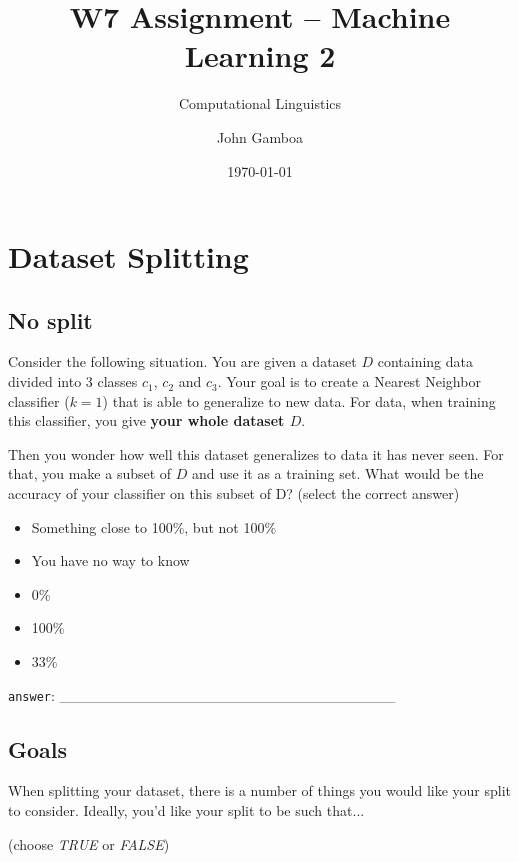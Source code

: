 \documentclass[a4paper,11pt]{scrartcl}
\title{W7 Assignment -- Machine Learning 2}
\subtitle{Computational Linguistics}
\author{John Gamboa}
\date{\today}
\begin{document}
\maketitle

\section{Dataset Splitting}

\subsection{No split}

Consider the following situation. You are given a dataset $D$ containing data
divided into 3 classes $c_1$, $c_2$ and $c_3$.
Your goal is to create a Nearest Neighbor classifier ($k=1$) that is able to
generalize to new data. For data, when training this classifier, you give
\textbf{your whole dataset $D$}.

Then you wonder how well this dataset generalizes to data it has never seen.
For that, you make a subset of $D$ and use it as a training set.
What would be the accuracy of your classifier on this subset of D?
(select the correct answer)

\begin{itemize}
\singlespacing
\item Something close to 100\%, but not 100\%
\item You have no way to know
\item 0\%
\item 100\%
\item 33\%
\end{itemize}

\verb|answer|: \_\_\_\_\_\_\_\_\_\_\_\_\_\_\_\_\_\_\_\_\_\_\_\_\_\_\_\_\_\_\_\_


\subsection{Goals}

When splitting your dataset, there is a number of things you would like your
split to consider. Ideally, you'd like your split to be such that...

(choose \textit{TRUE} or \textit{FALSE})
\end{document}
